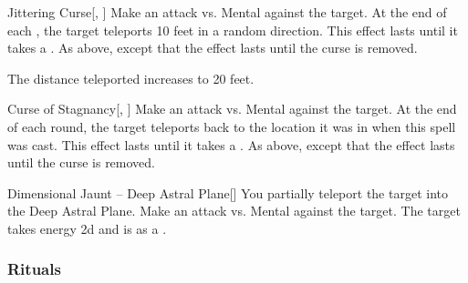 \lowercase{\hypertarget{spell:Jittering Curse}{}}\label{spell:Jittering Curse}
\begin{freeability}[Rank 6]{\hypertarget{spell:Jittering Curse}{Jittering Curse}}[, ]
Make an attack vs. Mental against the target.
\hit At the end of each , the target teleports 10 feet in a random direction.
This effect lasts until it takes a .
\crit As above, except that the effect lasts until the curse is removed.

\rankline
{} The distance teleported increases to 20 feet.
\end{freeability}
\vspace{0.25em}



\lowercase{\hypertarget{spell:Curse of Stagnancy}{}}\label{spell:Curse of Stagnancy}
\begin{freeability}[Rank 8]{\hypertarget{spell:Curse of Stagnancy}{Curse of Stagnancy}}[, ]
Make an attack vs. Mental against the target.
\hit At the end of each round, the target teleports back to the location it was in
when this spell was cast.
This effect lasts until it takes a .
\crit As above, except that the effect lasts until the curse is removed.
\end{freeability}
\vspace{0.25em}



\lowercase{\hypertarget{spell:Dimensional Jaunt -- Deep Astral Plane}{}}\label{spell:Dimensional Jaunt -- Deep Astral Plane}
\begin{freeability}[Rank 8]{\hypertarget{spell:Dimensional Jaunt -- Deep Astral Plane}{Dimensional Jaunt -- Deep Astral Plane}}[]
You partially teleport the target into the Deep Astral Plane.
Make an attack vs. Mental against the target.
\hit The target takes energy  \minus2d and is  as a .
\end{freeability}
\vspace{0.25em}



\subsubsection{Rituals}


